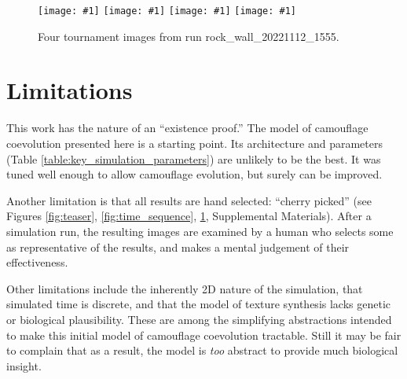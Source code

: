 \documentclass[letterpaper]{article}
\newcommand{\runID}{\footnotesize}
\newcommand{\igfour}[1]{\texttt{[image: \#1]}}
\begin{document}

\begin{figure}
    \igfour{20221112_1555_step_6495.png}
    \hfill
    \igfour{20221112_1555_step_5510.png}
    \hfill
    \igfour{20221112_1555_step_5681.png}
    \hfill
    \igfour{20221112_1555_step_6370.png}
    \caption{Four tournament images from run {\runID rock\_wall\_20221112\_1555}.}
    \label{fig:rock_wall_4x}
\end{figure}


\section{Limitations}
\label{subsec:limitations}
This work has the nature of an “existence proof.” The model of camouflage coevolution presented here is a starting point. Its architecture and parameters (Table \ref{table:key_simulation_parameters}) are unlikely to be the best. It was tuned well enough to allow camouflage evolution, but surely can be improved.
\par
Another limitation is that all results are hand selected: “cherry picked” (see Figures \ref{fig:teaser}, \ref{fig:time_sequence}, \ref{fig:rock_wall_4x}, Supplemental Materials). After a simulation run, the resulting images are examined by a human who selects some as representative of the results, and makes a mental judgement of their effectiveness.
\par
Other limitations include the inherently 2D nature of the simulation, that simulated time is discrete, and that the model of texture synthesis lacks genetic or biological plausibility. These are among the simplifying abstractions intended to make this initial model of camouflage coevolution tractable. Still it may be fair to complain that as a result, the model is \textit{too} abstract to provide much biological insight.
\par

\end{document}
